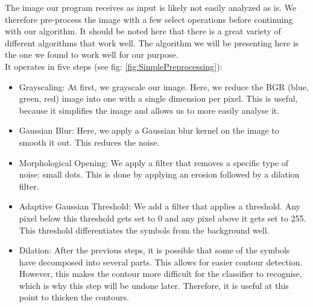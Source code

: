\documentclass[12pt]{article}
\begin{document}
		The image our program receives as input is likely not easily analyzed as is.
		We therefore pre-process the image with a few select operations before continuing with our algorithm.
		It should be noted here that there is a great variety of different algorithms that work well.
		The algorithm we will be presenting here is the one we found to work well for our purpose.\\
		It operates in five steps (see fig: \ref{fig:SimplePreprocessing}):
		\begin{itemize}
			\item Grayscaling: At first, we grayscale our image.
			Here, we reduce the BGR (blue, green, red) image into one with a single dimension per pixel.
			This is useful, because it simplifies the image and allows us to more easily analyse it.
			\item Gaussian Blur: Here, we apply a Gaussian blur kernel on the image to smooth it out. This reduces the noise.
			\item Morphological Opening: We apply a filter that removes a specific type of noise: small dots. This is done by applying an erosion followed by a dilation filter. %
			\item Adaptive Gaussian Threshold: We add a filter that applies a threshold. 
			Any pixel below this threshold gets set to 0 and any pixel above it gets set to 255. %
			This threshold differentiates the symbols from the background well.
			\item Dilation: After the previous steps, it is possible that some of the symbols have decomposed into several parts.
			This allows for easier contour detection.
			However, this makes the contour more difficult for the classifier to recognise, which is why this step will be undone later. %
			Therefore, it is useful at this point to thicken the contours.
		\end{itemize}
			
	
\end{document}
